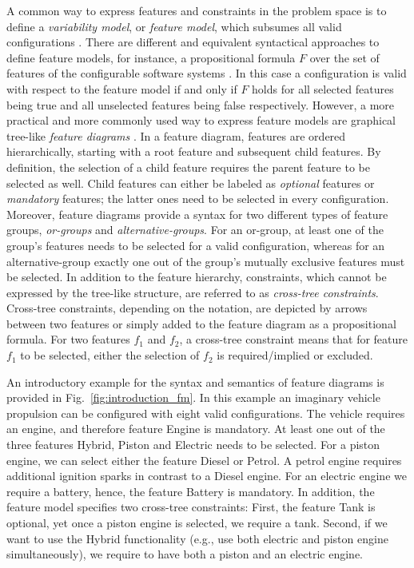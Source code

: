 A common way to express features and constraints in the problem space is to
define a \emph{variability model}, or \emph{feature model}, which subsumes all
valid configurations
\citep{kang_feature-oriented_1990,apel_feature-oriented_2013}. There are different and equivalent syntactical approaches to define feature models, for instance, a propositional formula $F$ over the set of
features of the configurable software systems \citep{batory_feature_2005}. In
this case a configuration is valid with respect to the feature model if and only if $F$ holds for all
selected features being true and all unselected features being false respectively. 
However, a more practical and more commonly used way to express feature models
are graphical tree-like \emph{feature diagrams}
\citep{apel_feature-oriented_2013}. In a feature diagram, features are ordered
hierarchically, starting with a root feature and subsequent child features. By
definition, the selection of a child feature requires the parent feature to be
selected as well. Child features can either be labeled as \emph{optional}
features  or \emph{mandatory} features; the latter ones need to be selected in
every configuration.
Moreover, feature diagrams
provide a syntax for two different types of feature groups, \emph{or-groups} and
\emph{alternative-groups}. For an or-group, at least one of the group's features
needs to be selected for a valid configuration, whereas for an alternative-group
exactly one out of the group's mutually exclusive features must be selected. In
addition to the feature hierarchy, constraints, which cannot be expressed by
the tree-like structure, are referred to as \emph{cross-tree constraints}.
Cross-tree constraints, depending on the notation, are depicted by arrows
between two features or simply added to the feature diagram as a propositional
formula. For two features $f_1$ and $f_2$, a cross-tree constraint means
that for feature $f_1$ to be selected, either the selection of $f_2$ is
required/implied or excluded.

An introductory example for the syntax and semantics of feature diagrams is
provided in Fig.~\ref{fig:introduction_fm}. In this example an imaginary
vehicle propulsion can be configured with eight valid configurations. The
vehicle requires an engine, and therefore feature \textsf{Engine} is mandatory.
At least one out of the three features \textsf{Hybrid}, \textsf{Piston} and \textsf{Electric} needs to be selected. For a piston engine, we can select either the feature \textsf{Diesel}
or \textsf{Petrol}. A petrol engine requires additional ignition sparks in
contrast to a Diesel engine. For an electric engine we require a
battery, hence, the feature \textsf{Battery} is mandatory.
In addition, the feature model specifies two cross-tree constraints: First, the
feature \textsf{Tank} is optional, yet once a piston engine is selected, we
require  a tank. Second, if we want to use the \textsf{Hybrid} functionality
(e.g., use both electric and piston engine simultaneously), we require to have both a piston
and an electric engine.

